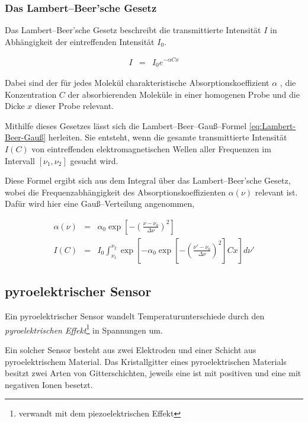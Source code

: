 \documentclass[12pt,a4paper]{scrartcl}
\numberwithin{equation}{section} %
\begin{document}
\hypertarget{das-lambertbeersche-gesetz}{\subsubsection{Das Lambert--Beer'sche Gesetz}\label{das-lambertbeersche-gesetz}}
Das Lambert--Beer'sche Gesetz beschreibt die transmittierte Intensität $I$ in Abhängigkeit der eintreffenden Intensität $I_0$. \cite{HakenWolf} %

\begin{eqnarray}
	I &=& I_0 e^{- \alpha C x} \label{eq:Lambert-Beer}
\end{eqnarray}

\noindent
Dabei sind der für jedes Molekül charakteristische Absorptionskoeffizient $\alpha$ , die Konzentration $C$ der absorbierenden Moleküle in einer homogenen Probe und die Dicke $x$ dieser Probe relevant.

Mithilfe dieses Gesetzes lässt sich die Lambert--Beer--Gauß--Formel \eqref{eq:Lambert-Beer-Gauß} herleiten. Sie entsteht, wenn die gesamte transmittierte Intensität $I(C)$ von eintreffenden elektromagnetischen Wellen aller Frequenzen im Intervall $[\nu_1, \nu_2]$ gesucht wird.

Diese Formel ergibt sich aus dem Integral über das Lambert--Beer'sche Gesetz, wobei die Frequenzabhängigkeit des Absorptionskoeffizienten $\alpha(\nu)$ relevant ist. Dafür wird hier eine Gauß--Verteilung angenommen,

\begin{eqnarray}
	\alpha(\nu) &=& \alpha_0 \exp[- \left(\frac{\nu - \nu_0}{\Delta \nu}\right)^2] \\
	I(C) &=& I_0 \int_{\nu_1}^{\nu_2} \exp[-\alpha_0 \exp \left[- \left(\frac{\nu' - \nu_0}{\Delta \nu}\right)^2\right] C x] d\nu' \label{eq:Lambert-Beer-Gauß}
\end{eqnarray}

\subsection{pyroelektrischer Sensor}
Ein pyroelektrischer Sensor wandelt Temperaturunterschiede durch den \emph{pyroelektrischen Effekt}\footnote{verwandt mit dem piezoelektrischen Effekt} in Spannungen um.

Ein solcher Sensor besteht aus zwei Elektroden und einer Schicht aus pyroelektrischem Material. Das Kristallgitter eines pyroelektrischen Materials besitzt zwei Arten von Gitterschichten, jeweils eine ist mit positiven und eine mit negativen Ionen besetzt. \cite{pyroelektrischer Sensor}
\end{document}
